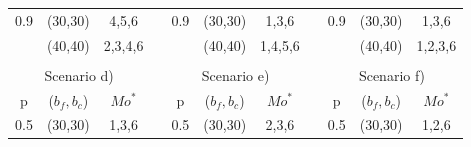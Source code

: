 \begin{table}[htbp]
{\begin{tabular}{ccccccccccc}
\multicolumn{1}{|c|}{\multirow{2}{*}{0.9}} & \multicolumn{1}{c|}{(30,30)}     & \multicolumn{1}{c|}{4,5,6}   & \multicolumn{1}{c|}{} & \multicolumn{1}{c|}{\multirow{2}{*}{0.9}} & \multicolumn{1}{c|}{(30,30)}     & \multicolumn{1}{c|}{1,3,6}   & \multicolumn{1}{c|}{} & \multicolumn{1}{c|}{\multirow{2}{*}{0.9}} & \multicolumn{1}{c|}{(30,30)}     & \multicolumn{1}{c|}{1,3,6}   \\ \cline{2-3} \cline{6-7} \cline{10-11} 
\multicolumn{1}{|c|}{}                     & \multicolumn{1}{c|}{(40,40)}     & \multicolumn{1}{c|}{2,3,4,6} & \multicolumn{1}{c|}{} & \multicolumn{1}{c|}{}                     & \multicolumn{1}{c|}{(40,40)}     & \multicolumn{1}{c|}{1,4,5,6} & \multicolumn{1}{c|}{} & \multicolumn{1}{c|}{}                     & \multicolumn{1}{c|}{(40,40)}     & \multicolumn{1}{c|}{1,2,3,6} \\ \cline{1-3} \cline{5-7} \cline{9-11} 
                                           &                                  &                              &                       &                                           &                                  &                              &                       &                                           &                                  &                              \\
\multicolumn{3}{c}{Scenario d)}                                                                              &                       & \multicolumn{3}{c}{Scenario e)}                                                                             &                       & \multicolumn{3}{c}{Scenario f)}                                                                             \\ \cline{1-3} \cline{5-7} \cline{9-11} 
\multicolumn{1}{|c|}{p}                    & \multicolumn{1}{c|}{($b_f,b_c$)} & \multicolumn{1}{c|}{$Mo^*$}  & \multicolumn{1}{c|}{} & \multicolumn{1}{c|}{p}                    & \multicolumn{1}{c|}{($b_f,b_c$)} & \multicolumn{1}{c|}{$Mo^*$}  & \multicolumn{1}{c|}{} & \multicolumn{1}{c|}{p}                    & \multicolumn{1}{c|}{($b_f,b_c$)} & \multicolumn{1}{c|}{$Mo^*$}  \\ \cline{1-3} \cline{5-7} \cline{9-11} 
\multicolumn{1}{|c|}{\multirow{2}{*}{0.5}} & \multicolumn{1}{c|}{(30,30)}     & \multicolumn{1}{c|}{1,3,6}   & \multicolumn{1}{c|}{} & \multicolumn{1}{c|}{\multirow{2}{*}{0.5}} & \multicolumn{1}{c|}{(30,30)}     & \multicolumn{1}{c|}{2,3,6}   & \multicolumn{1}{c|}{} & \multicolumn{1}{c|}{\multirow{2}{*}{0.5}} & \multicolumn{1}{c|}{(30,30)}     & \multicolumn{1}{c|}{1,2,6}   \\ \cline{2-3} \cline{6-7} \cline{10-11} 

\end{tabular}}
\end{table}

